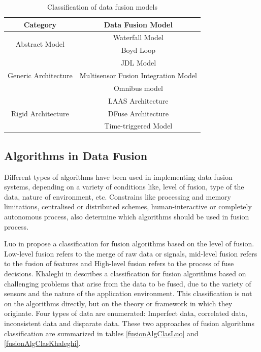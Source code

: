 

\begin{table}[ht!]
\footnotesize
\centering
\begin{tabular}{|c | c|}
\hline
\textbf{Category} & \textbf{Data Fusion Model} \\
\hline
\multirow{2}{*}{Abstract Model} & Waterfall Model \cite{Harris1998} \\
& Boyd Loop \cite{Boyd1987} \\
\hline
\multirow{3}{*}{Generic Architecture} & JDL Model \cite{White1991} \\
& Multisensor Fusion Integration Model \cite{Luo1989} \\
& Omnibus model \cite{Bedworth2000} \\
\hline
\multirow{3}{*}{Rigid Architecture} & LAAS Architecture \cite{Alami1998} \\
& DFuse Architecture \cite{Kumar2003} \\
& Time-triggered Model \cite{Elmenreich2001} \\
\hline
\end{tabular}
\caption{Classification of data fusion models}
\label{fusionModelsClas}
\end{table}


\subsection{Algorithms in Data Fusion}

Different types of algorithms have been used in implementing data fusion systems, depending on a variety of conditions like, level of fusion, type of the data, nature of environment, etc. Constrains like processing and memory limitations, centralised or distributed schemes, human-interactive or completely autonomous process, also determine which algorithms should be used in fusion process.

Luo in \cite{Luo2011} propose a classification for fusion algorithms based on the level of fusion. Low-level fusion refers to the merge of raw data or signals, mid-level fusion refers to the fusion of features and High-level fusion refers to the process of fuse decisions. Khaleghi in \cite{Khaleghi2013} describes a classification for fusion algorithms based on challenging problems that arise from the data to be fused, due to the variety of sensors and the nature of the application environment. This classification is not on the algorithms directly, but on the theory or framework in which they originate. Four types of data are enumerated: Imperfect data, correlated data, inconsistent data and disparate data. These two approaches of fusion algorithms classification are summarized in tables \ref{fusionAlgClasLuo} and \ref{fusionAlgClasKhaleghi}.

